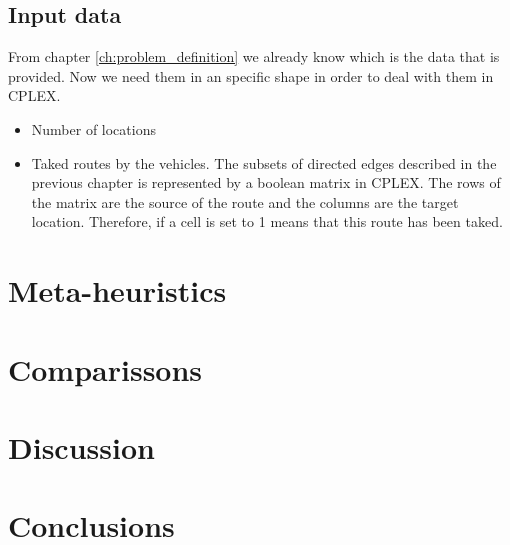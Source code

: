 \documentclass[]{report}
\begin{document}
\section{Input data}

From chapter \ref{ch:problem_definition} we already know which is the data that is provided. Now we need them in an specific shape in order to deal with them in CPLEX.

\begin{itemize}
	\item Number of locations
	\item Taked routes by the vehicles. The subsets of directed edges described in the previous chapter is represented by a boolean matrix in CPLEX. The rows of the matrix are the source of the route and the columns are the target location. Therefore, if a cell is set to 1 means that this route has been taked.
\end{itemize}

\chapter{Meta-heuristics}\label{ch:meta_heuristics}

\chapter{Comparissons}\label{ch:comparisson}

\chapter{Discussion}\label{ch:discussion}

\chapter{Conclusions}\label{ch:conclusions}
\end{document}
